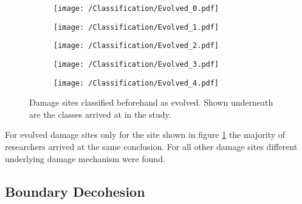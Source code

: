 \begin{figure}[H]
\begin{subfigure}{.2\textwidth}
\centering
  \texttt{[image: /Classification/Evolved\_0.pdf]}
  \caption{}
  \label{fig:Ev1}
\end{subfigure}%
\begin{subfigure}{.2\textwidth}
\centering
  \texttt{[image: /Classification/Evolved\_1.pdf]}
  \caption{}
  \label{fig:Ev2}
\end{subfigure}%
\centering
\begin{subfigure}{.2\textwidth}
\centering
  \texttt{[image: /Classification/Evolved\_2.pdf]}
  \caption{}
  \label{fig:Ev3}
\end{subfigure}%
\begin{subfigure}{.2\textwidth}
\centering
  \texttt{[image: /Classification/Evolved\_3.pdf]}
  \caption{}
  \label{fig:Ev4}
\end{subfigure}%
\begin{subfigure}{.2\textwidth}
\centering
  \texttt{[image: /Classification/Evolved\_4.pdf]}
  \caption{}
  \label{fig:Ev5}
\end{subfigure}%
\caption{Damage sites classified beforehand as evolved. Shown underneath are the classes arrived at in the study.}
\label{fig:EvolvedStudy}
\end{figure}



For evolved damage sites only for the site shown in figure \ref{fig:Ev1} the majority of researchers arrived at the same conclusion. For all other damage sites different underlying damage mechanism were found.

\subsection{Boundary Decohesion}

